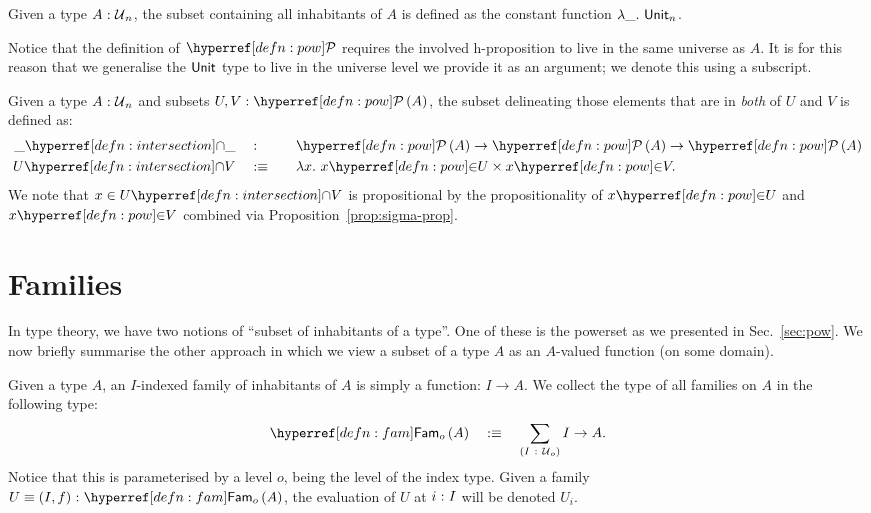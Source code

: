 \begin{defn}\label{defn:entire-subset}
  Given a type $A\hspace{0.1mm}:\hspace{0.1mm}\mathcal{U}{}_n$, the subset containing all inhabitants of $A$ is
  defined as the constant function $\lambda\_.~\mathsf{Unit}{}_n$.
\end{defn}

Notice that the definition of $\pownm{}$ requires the involved h-proposition to live in
the same universe as $A$. It is for this reason that we generalise the $\mathsf{Unit}{}$ type to
live in the universe level we provide it as an argument; we denote this using a subscript.

\begin{defn}\label{defn:intersection}
  Given a type $A\hspace{0.1mm}:\hspace{0.1mm}\mathcal{U}{}_n$ and subsets $\oftyII{U}{V}{\pow{A}}$, the subset
  delineating those elements that are in \emph{both} of $U$ and $V$ is defined as:
  \begin{alignat*}{2}
    \intersect{\_}{\_}  \quad&:\quad   && \pow{A} \rightarrow \pow{A} \rightarrow \pow{A}         \\
    \intersect{U}{V}    \quad&\is\quad && \lambda x.~ \mempow{x}{U} \times \mempow{x}{V} .
  \end{alignat*}
  We note that $x \in \intersect{U}{V}$ is propositional by the propositionality of
  $\mempow{x}{U}$ and $\mempow{x}{V}$ combined via Proposition~\ref{prop:sigma-prop}.
\end{defn}

\section{Families}\label{sec:fam}

In type theory, we have two notions of ``subset of inhabitants of a type''. One of these
is the powerset as we presented in Sec.~\ref{sec:pow}. We now briefly summarise the other
approach in which we view a subset of a type $A$ as an $A$-valued function (on some
domain).

\begin{defn}[Family]\label{defn:fam}
  Given a type $A$, an $I$-indexed family of inhabitants of $A$ is simply a function:
  $I \rightarrow A$. We collect the type of all families on $A$ in the following type:
  \begin{equation*}
    \sub{o}{A} \quad\is\quad \sigmaty{I}{\univ{}_o}{I \rightarrow A}.
  \end{equation*}
  Notice that this is parameterised by a level $o$, being the level of the index type.
  Given a family $\oftyI{U \equiv (I, f)}{\sub{o}{A}}$, the evaluation of $U$ at $i\hspace{0.1mm}:\hspace{0.1mm}I$
  will be denoted $U_i$.
\end{defn}

